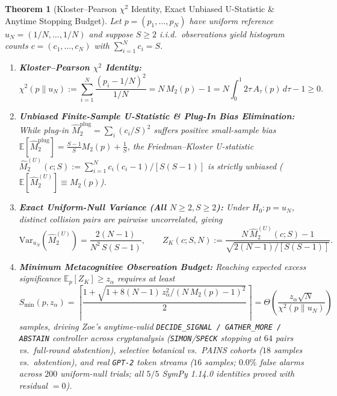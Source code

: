 \documentclass[11pt,letterpaper]{article}
\newtheorem{theorem}{Theorem}
\begin{document}
\begin{theorem}[Kloster--Pearson $\chi^2$ Identity, Exact Unbiased U-Statistic \& Anytime Stopping Budget]
\label{thm:stopping}
Let $p = (p_1, \dots, p_N)$ have uniform reference $u_N = (1/N,\dots,1/N)$ and suppose $S \ge 2$ i.i.d.\ observations yield histogram counts $c = (c_1,\dots,c_N)$ with $\sum_{i=1}^N c_i = S$.
\begin{enumerate}
  \item \textbf{Kloster--Pearson $\chi^2$ Identity:}
  \begin{equation}
    \chi^2(p \parallel u_N) := \sum_{i=1}^N \frac{(p_i - 1/N)^2}{1/N} = N\,M_2(p) - 1 = N\int_0^1 2\tau\,A_\tau(p)\,d\tau - 1 \ge 0.
  \end{equation}
  \item \textbf{Unbiased Finite-Sample U-Statistic \& Plug-In Bias Elimination:} While plug-in $\widehat{M}_2^{\mathrm{plug}} = \sum_i (c_i/S)^2$ suffers positive small-sample bias $\mathbb{E}[\widehat{M}_2^{\mathrm{plug}}] = \frac{S-1}{S}M_2(p) + \frac{1}{S}$, the Friedman--Kloster U-statistic $\widehat{M}_2^{(U)}(c; S) := \sum_{i=1}^N c_i(c_i-1)/[S(S-1)]$ is strictly unbiased ($\mathbb{E}[\widehat{M}_2^{(U)}] \equiv M_2(p)$).
  \item \textbf{Exact Uniform-Null Variance (All $N \ge 2, S \ge 2$):} Under $H_0: p = u_N$, distinct collision pairs are pairwise uncorrelated, giving
  \begin{equation}
    \mathrm{Var}_{u_N}\!\left(\widehat{M}_2^{(U)}\right) = \frac{2(N-1)}{N^2\,S(S-1)},
    \qquad
    Z_K(c; S, N) := \frac{N\,\widehat{M}_2^{(U)}(c; S) - 1}{\sqrt{2(N-1)/[S(S-1)]}}.
  \end{equation}
  \item \textbf{Minimum Metacognitive Observation Budget:} Reaching expected excess significance $\mathbb{E}_p[Z_K] \ge z_\alpha$ requires at least
  \begin{equation}
    S_{\min}(p, z_\alpha) = \left\lceil \frac{1 + \sqrt{1 + 8(N-1)\,z_\alpha^2 / (N\,M_2(p) - 1)^2}}{2} \right\rceil = \Theta\!\left(\frac{z_\alpha\sqrt{N}}{\chi^2(p \parallel u_N)}\right)
  \end{equation}
  samples, driving Zoe's anytime-valid \texttt{DECIDE\_SIGNAL / GATHER\_MORE / ABSTAIN} controller across cryptanalysis (\texttt{SIMON}/\texttt{SPECK} stopping at $64$ pairs vs.\ full-round abstention), selective botanical vs.\ PAINS cohorts ($18$ samples vs.\ abstention), and real \texttt{GPT-2} token streams ($16$ samples; $0.0\%$ false alarms across $200$ uniform-null trials; all $5/5$ SymPy 1.14.0 identities proved with residual $= 0$).
\end{enumerate}
\end{theorem}
\end{document}
